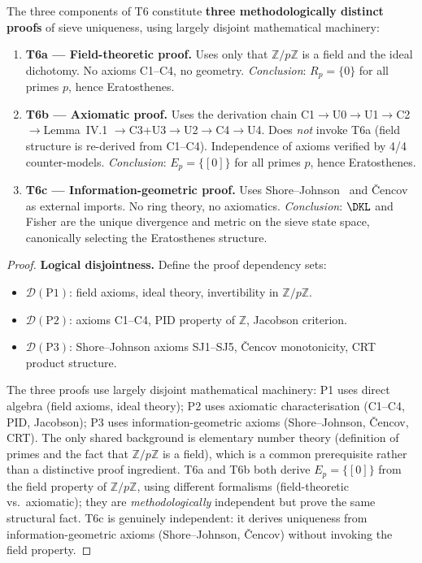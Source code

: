 \documentclass[12pt,a4paper]{article}
\begin{document}
\begin{theorem}
\label{thm:T6_independence}
The three components of T6 constitute \textbf{three methodologically distinct proofs}
of sieve uniqueness, using largely disjoint mathematical machinery:

\begin{enumerate}[label=\textbf{(P\arabic*)}]
\item \textbf{T6a --- Field-theoretic proof.}
  Uses only that $\mathbb{Z}/p\mathbb{Z}$ is a field and the ideal dichotomy.
  No axioms C1--C4, no geometry.
  \emph{Conclusion}: $R_p = \{0\}$ for all primes $p$, hence Eratosthenes.

\item \textbf{T6b --- Axiomatic proof.}
  Uses the derivation chain C1$\to$U0$\to$U1$\to$C2$\to$Lemma~IV.1
  $\to$C3+U3$\to$U2$\to$C4$\to$U4.
  Does \emph{not} invoke T6a (field structure is re-derived from C1--C4).
  Independence of axioms verified by 4/4 counter-models.
  \emph{Conclusion}: $E_p = \{[0]\}$ for all primes $p$, hence Eratosthenes.

\item \textbf{T6c --- Information-geometric proof.}
  Uses Shore--Johnson~\cite{ShoreJohnson1980} and \v{C}encov~\cite{Cencov1982}
  as external imports.  No ring theory, no axiomatics.
  \emph{Conclusion}: $\DKL$ and Fisher are the unique divergence and metric
  on the sieve state space, canonically selecting the Eratosthenes structure.
\end{enumerate}

\begin{proof}
\textbf{Logical disjointness.} Define the proof dependency sets:
\begin{itemize}[nosep]
\item $\mathcal{D}(\text{P1})$: field axioms, ideal theory, invertibility in $\mathbb{Z}/p\mathbb{Z}$.
\item $\mathcal{D}(\text{P2})$: axioms C1--C4, PID property of $\mathbb{Z}$, Jacobson criterion.
\item $\mathcal{D}(\text{P3})$: Shore--Johnson axioms SJ1--SJ5, \v{C}encov monotonicity, CRT product structure.
\end{itemize}
The three proofs use largely disjoint mathematical machinery:
P1 uses direct algebra (field axioms, ideal theory);
P2 uses axiomatic characterisation (C1--C4, PID, Jacobson);
P3 uses information-geometric axioms (Shore--Johnson, \v{C}encov, CRT).
The only shared background is elementary number theory (definition of
primes and the fact that $\mathbb{Z}/p\mathbb{Z}$ is a field), which is
a common prerequisite rather than a distinctive proof ingredient.
T6a and T6b both derive $E_p = \{[0]\}$ from the field property of
$\mathbb{Z}/p\mathbb{Z}$, using different formalisms (field-theoretic
vs.\ axiomatic); they are \emph{methodologically} independent but prove
the same structural fact.  T6c is genuinely independent: it derives
uniqueness from information-geometric axioms (Shore--Johnson,
\v{C}encov) without invoking the field property.


\end{proof}
\end{theorem}
\end{document}
